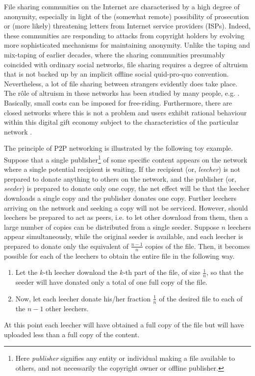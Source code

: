 \documentclass[12pt,english]{apa6}
\begin{document}
File sharing communities on the Internet are characterised by a high
degree of anonymity, especially in light of the (somewhat remote)
possibility of prosecution or (more likely) threatening letters from
Internet service providers (ISPs). Indeed, these communities are responding
to attacks from copyright holders by evolving more sophisticated mechanisms
for maintaining anonymity. Unlike the taping and mix-taping of earlier
decades, where the sharing communities presumably coincided with ordinary
social networks, file sharing requires a degree of altruism that is
not backed up by an implicit offline social quid-pro-quo convention. Nevertheless,
a lot of file sharing between strangers evidently does take place.
The rôle of altruism in these networks has been studied by many people,
e.g. \citet{feldman_free-riding_2006}. Basically, small costs can
be imposed for free-riding. Furthermore, there are closed networks
where this is not a problem and users exhibit rational behaviour within
this‭ ‬digital gift economy \citep{becker_dynamics_2006} subject
to the characteristics of the particular network‭ \citep{feldman_free-riding_2006}‬.‭ 

The principle of P2P networking is illustrated by the following toy
example. Suppose that a single publisher\footnote{Here \emph{publisher} signifies any entity or individual making a
file available to others, and not necessarily the copyright owner
or offline publisher.} of some specific content appears on the network where a single potential
recipient is waiting. If the recipient (or, \emph{leecher}) is not
prepared to donate anything to others on the network, and the publisher
(or, \emph{seeder}) is prepared to donate only one copy, the net effect
will be that the leecher downloads a single copy and the publisher
donates one copy. Further leechers arriving on the network and seeking
a copy will not be serviced. However, should leechers be prepared
to act as peers, i.e. to let other download from them, then a large
number of copies can be distributed from a single seeder. Suppose
$n$ leechers appear simultaneously, while the original seeder is
available, and each leecher is prepared to donate only the equivalent
of $\frac{n-1}{n}$ copies of the file. Then, it becomes possible
for each of the leechers to obtain the entire file in the following
way.
\begin{enumerate}
\item Let the $k$-th leecher download the $k$-th part of the file, of
size $\frac{1}{n}$, so that the seeder will have donated only a total
of one full copy of the file.
\item Now, let each leecher donate his/her fraction $\frac{1}{n}$ of the
desired file to each of the $n-1$ other leechers.
\end{enumerate}
At this point each leecher will have obtained a full copy of the file
but will have uploaded less than a full copy of the content.
\end{document}
